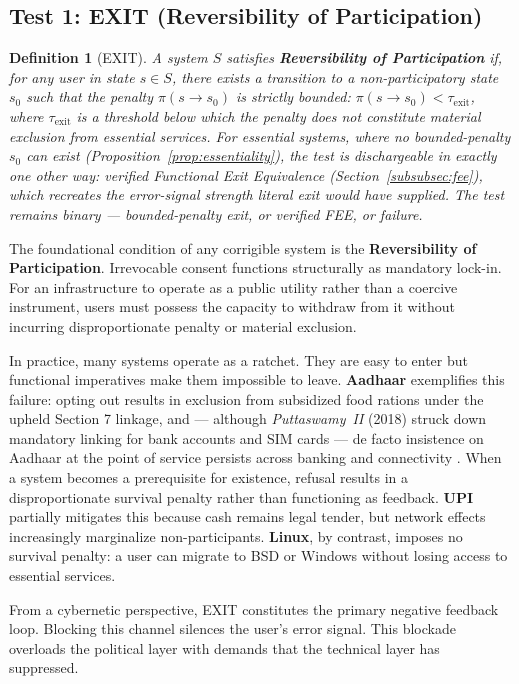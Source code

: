 \documentclass{article}
\newtheorem{definition}{Definition}[section]
\begin{document}
\subsection{Test 1: EXIT (Reversibility of Participation)}

\begin{definition}[EXIT]
\label{def:exit}
A system $S$ satisfies \textbf{Reversibility of Participation} if, for any user in state $s \in S$, there exists a transition to a non-participatory state $s_0$ such that the penalty $\pi(s \to s_0)$ is strictly bounded: $\pi(s \to s_0) < \tau_{\text{exit}}$, where $\tau_{\text{exit}}$ is a threshold below which the penalty does not constitute material exclusion from essential services. For essential systems, where no bounded-penalty $s_0$ can exist (Proposition~\ref{prop:essentiality}), the test is dischargeable in exactly one other way: verified Functional Exit Equivalence (Section~\ref{subsubsec:fee}), which recreates the error-signal strength literal exit would have supplied. The test remains binary --- bounded-penalty exit, or verified FEE, or failure.
\end{definition}

The foundational condition of any corrigible system is the \textbf{Reversibility of Participation}. Irrevocable consent functions structurally as mandatory lock-in. For an infrastructure to operate as a public utility rather than a coercive instrument, users must possess the capacity to withdraw from it without incurring disproportionate penalty or material exclusion.

In practice, many systems operate as a ratchet. They are easy to enter but functional imperatives make them impossible to leave. \textbf{Aadhaar} exemplifies this failure: opting out results in exclusion from subsidized food rations under the upheld Section 7 linkage, and --- although \textit{Puttaswamy~II} (2018) struck down mandatory linking for bank accounts and SIM cards --- de facto insistence on Aadhaar at the point of service persists across banking and connectivity \citep{puttaswamy2018,khera2019}. When a system becomes a prerequisite for existence, refusal results in a disproportionate survival penalty rather than functioning as feedback. \textbf{UPI} partially mitigates this because cash remains legal tender, but network effects increasingly marginalize non-participants. \textbf{Linux}, by contrast, imposes no survival penalty: a user can migrate to BSD or Windows without losing access to essential services.

From a cybernetic perspective, EXIT constitutes the primary negative feedback loop. Blocking this channel silences the user's error signal. This blockade overloads the political layer with demands that the technical layer has suppressed.
\end{document}
